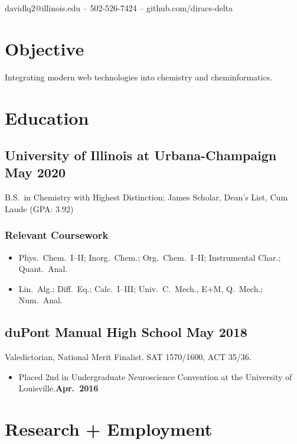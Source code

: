 \documentclass{article}
\makeatletter
\renewcommand{\maketitle}
{
	\begin{center}
	{\huge\bfseries\theauthor}

	\vspace{0.5em}
	davidlq2@illinois.edu -- 502-526-7424 -- github.com/diracs-delta
	\end{center}
}
\makeatother
\begin{document}
\author{David Qiu}
\maketitle

\section{Objective}
Integrating modern web technologies into chemistry and cheminformatics.

\section{Education}

\subsection{University of Illinois at Urbana-Champaign \hfill May 2020}
B.S.\ in Chemistry with Highest Distinction; James Scholar, Dean's List, Cum Laude (GPA: 3.92)

\subsubsection{Relevant Coursework}

\begin{itemize}[noitemsep,nolistsep]
	\item Phys.\ Chem.\ I--II; Inorg.\ Chem.; Org.\ Chem.\ I--II; Instrumental
		Char.; Quant.\ Anal.

	\item Lin.\ Alg.; Diff.\ Eq.; Calc.\ I--III; Univ.\ C.\ Mech., E+M, Q.\
		Mech.; Num.\ Anal.
\end{itemize}

\subsection{duPont Manual High School \hfill May 2018}
Valedictorian, National Merit Finalist. SAT 1570/1600, ACT 35/36.

\begin{itemize}[noitemsep,nolistsep]
	\item Placed 2nd in Undergraduate Neuroscience Convention at the University
		of Louisville.\hfill\textbf{Apr.\ 2016}
\end{itemize}

\section{Research + Employment}
\end{document}
